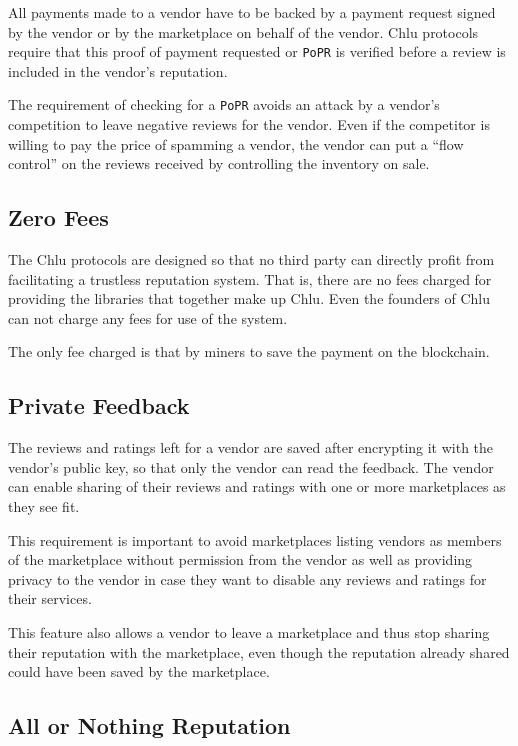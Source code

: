 \documentclass[a4paper]{article}
\begin{document}
All payments made to a vendor have to be backed by a payment request
signed by the vendor or by the marketplace on behalf of the
vendor. Chlu protocols require that this proof of payment requested or
\texttt{PoPR} is verified before a review is included in the vendor's
reputation.

The requirement of checking for a \texttt{PoPR} avoids an attack by a vendor's
competition to leave negative reviews for the vendor. Even if the
competitor is willing to pay the price of spamming a vendor, the
vendor can put a “flow control” on the reviews received by controlling
the inventory on sale.

\subsection{Zero Fees}

The Chlu protocols are designed so that no third party can directly
profit from facilitating a trustless reputation system. That is, there
are no fees charged for providing the libraries that together make up
Chlu. Even the founders of Chlu can not charge any fees for use of the
system.

The only fee charged is that by miners to save the payment on the
blockchain.

\subsection{Private Feedback}

The reviews and ratings left for a vendor are saved after encrypting
it with the vendor's public key, so that only the vendor can read the
feedback. The vendor can enable sharing of their reviews and ratings
with one or more marketplaces as they see fit.

This requirement is important to avoid marketplaces listing vendors as
members of the marketplace without permission from the vendor as well
as providing privacy to the vendor in case they want to disable any
reviews and ratings for their services.

This feature also allows a vendor to leave a marketplace and thus stop
sharing their reputation with the marketplace, even though the
reputation already shared could have been saved by the marketplace.

\subsection{All or Nothing Reputation}
\end{document}
